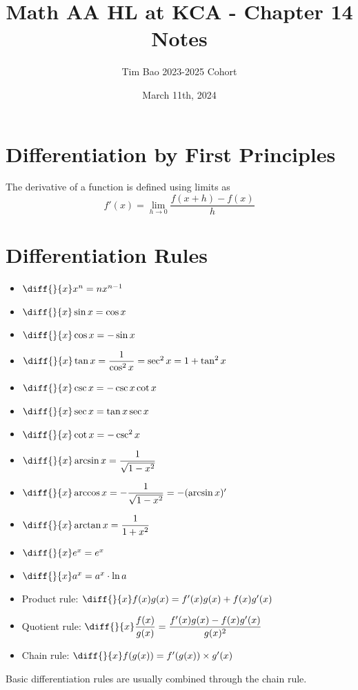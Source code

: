 \documentclass[11pt]{article}
\title{Math AA HL at KCA - Chapter 14 Notes}
\author{Tim Bao 2023-2025 Cohort}
\date{March 11th, 2024}
\begin{document}
\maketitle
\pagebreak
\tableofcontents
\pagebreak

\section{Differentiation by First Principles}

The derivative of a function is defined using limits as $$f'(x) = \lim\limits_{h \to 0}\frac{f(x + h) - f(x)}{h}$$

\pagebreak

\section{Differentiation Rules}

\begin{itemize}
  \item $\diff{}{x}x^n = nx^{n - 1}$
  \item $\diff{}{x}\sin x = \cos x$
  \item $\diff{}{x}\cos x = -\sin x$
  \item $\diff{}{x}\tan x = \dfrac{1}{\cos^2 x} = \sec^2x = 1 + \tan^2 x$
  \item $\diff{}{x}\csc x = -\csc x \cot x$
  \item $\diff{}{x}\sec x = \tan x \sec x$
  \item $\diff{}{x}\cot x = -\csc^2 x$
  \item $\diff{}{x}\arcsin x = \dfrac{1}{\sqrt{1 - x^2}}$
  \item $\diff{}{x}\arccos x = -\dfrac{1}{\sqrt{1 - x^2}} = -(\arcsin x)'$
  \item $\diff{}{x}\arctan x = \dfrac{1}{1 + x^2}$
  \item $\diff{}{x}e^x = e^x$
  \item $\diff{}{x}a^x = a^x\cdot \ln a$
  \item Product rule: $\diff{}{x}f(x)g(x) = f'(x)g(x) + f(x)g'(x)$
  \item Quotient rule: $\diff{}{x}\dfrac{f(x)}{g(x)} = \dfrac{f'(x)g(x) - f(x)g'(x)}{g(x)^2}$
  \item Chain rule: $\diff{}{x}f(g(x)) = f'(g(x)) \times g'(x)$
\end{itemize}

\vspace{0.5cm}

\noindent Basic differentiation rules are usually combined through the chain rule.
\end{document}
